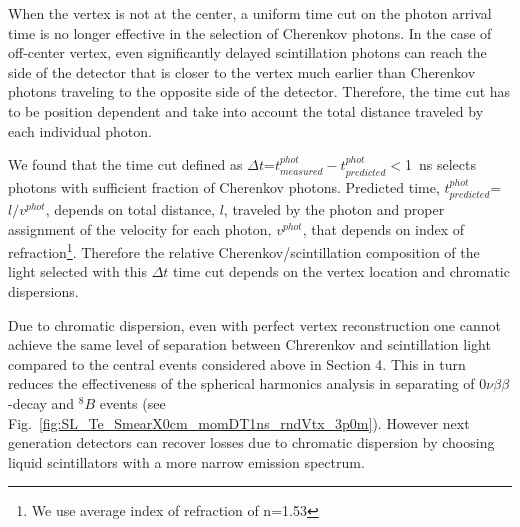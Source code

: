 \documentclass[12pt,twoside,letterpaper]{article}
\newcommand{\vbb}{0\nu\beta\beta}
\newcommand{\B}{^{8}B}
\begin{document}
When the vertex is not at the center, a uniform time cut on the photon arrival time is no longer effective in the selection of Cherenkov photons. In the case of off-center vertex, even significantly delayed scintillation photons can reach the side of the detector that is closer to the vertex much earlier than Cherenkov photons traveling to the opposite side of the detector. Therefore, the time cut has to be position dependent and take into account the total distance traveled by each individual photon.

We found that the time cut defined as $\Delta t$=$t^{phot}_{measured} - t^{phot}_{predicted}$$<$1~ns selects photons with sufficient fraction of Cherenkov photons. Predicted time, $ t^{phot}_{predicted}$=$l/v^{phot}$, depends on total distance, $l$, traveled by the photon and proper assignment of the velocity for each photon, $v^{phot}$, that depends on index of refraction\footnote{We use average index of refraction of n=1.53}. Therefore the relative Cherenkov/scintillation composition of the light selected with this $\Delta t$ time cut depends on the vertex location and chromatic dispersions. 

Due to chromatic dispersion, even with perfect vertex reconstruction one cannot achieve the same level of separation between Chrerenkov and scintillation light compared to the central events considered above in Section 4. This in turn reduces the effectiveness of the spherical harmonics analysis in separating of $\vbb$-decay and $\B$ events (see Fig.~\ref{fig:SL_Te_SmearX0cm_momDT1ns_rndVtx_3p0m}). However next generation detectors can recover losses due to chromatic dispersion by choosing liquid scintillators with a more narrow emission spectrum.
\end{document}
